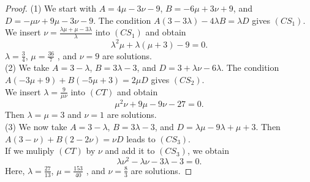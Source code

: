 \documentclass[12pt]{article}
\begin{document}
	\begin{proof}
		(1) We start with  $A = 4 \mu - 3 \nu -9 $, $B = -6\mu + 3 \nu +9$, and   $D = - \mu \nu + 9 \mu - 3\nu -9 $. The condition $A(3 -3\lambda) - 4\lambda B= \lambda D $ gives $(CS_1)$.\\ 
		We insert $\nu = \frac{\lambda \mu + \mu - 3 \lambda}{\lambda}$ into $(CS_1)$ and obtain $$\lambda^2 \mu +\lambda(\mu +3)-9 =0 .$$ $\lambda = \frac{3}{4} $, $\mu = \frac{36}{7}$ , and $\nu =9$ are solutions.\\
		(2) We take $A = 3-\lambda$, $B= 3\lambda -3$, and $D=3 +\lambda \nu -6 \lambda$. The condition
		$A(-3 \mu +9) + B(-5\mu +3)= 2\mu D$ gives $(CS_2)$. \\ We insert $\lambda = \frac{9}{\mu \nu}$ into $(CT)$ and obtain $$\mu^2 \nu + 9\mu -9\nu -27 = 0 .$$ Then $\lambda = \mu =3$ and $\nu =1$ are solutions.\\
		(3) We now take $A = 3-\lambda$, $B= 3\lambda -3$, and $D=\lambda \mu -9 \lambda + \mu +3$. Then 
		$A(3- \nu) + B(2 - 2\nu ) = \nu D$ leads to $(CS_3)$.\\
		If we muliply $(CT)$ by $\nu$ and add it to $(CS_3)$, we obtain $$\lambda \nu^2 -\lambda \nu - 3 \lambda -3= 0.$$ Here, $\lambda = \frac{27}{13} $, $\mu = \frac{153}{40}$ , and $\nu =\frac{8}{3}$ are solutions.		
	\end{proof}
\end{document}
